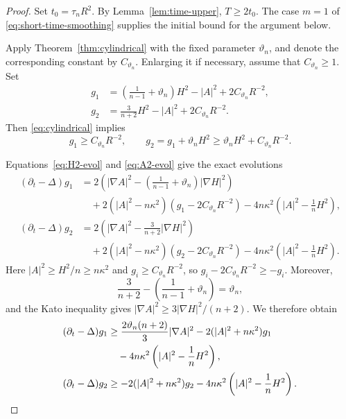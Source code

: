 \documentclass[11pt,reqno]{amsart}
\theoremstyle{definition}
\theoremstyle{remark}
\numberwithin{equation}{section}
\begin{document}
\begin{proof}
Set $t_0=\tau_nR^2$.  By Lemma~\ref{lem:time-upper}, $T\geq2t_0$.
The case $m=1$ of \eqref{eq:short-time-smoothing} supplies the initial bound
for the argument below.

Apply Theorem~\ref{thm:cylindrical} with the fixed parameter $\vartheta_n$,
and denote the corresponding constant by $C_{\vartheta_n}$.  Enlarging it if
necessary, assume that $C_{\vartheta_n}\geq1$.  Set
\begin{align*}
 g_1&=
 \left(\frac1{n-1}+\vartheta_n\right)H^2-|A|^2
 +2C_{\vartheta_n}R^{-2},\\
 g_2&=
 \frac3{n+2}H^2-|A|^2
 +2C_{\vartheta_n}R^{-2}.
\end{align*}
Then \eqref{eq:cylindrical} implies
\begin{equation}\label{eq:g1g2-lower}
 g_1\geq C_{\vartheta_n}R^{-2},
 \qquad
 g_2=g_1+\vartheta_nH^2
 \geq\vartheta_nH^2+C_{\vartheta_n}R^{-2}.
\end{equation}

Equations~\eqref{eq:H2-evol} and \eqref{eq:A2-evol} give the exact
evolutions
\begin{align*}
 (\partial_t-\Delta)g_1
 &={}
 2\left(|\nabla A|^2
 -\left(\frac1{n-1}+\vartheta_n\right)|\nabla H|^2\right)\\
 &\quad
 +2(|A|^2-n\kappa^2)
 \left(g_1-2C_{\vartheta_n}R^{-2}\right)
 -4n\kappa^2\left(|A|^2-\frac1nH^2\right),\\
 (\partial_t-\Delta)g_2
 &={}
 2\left(|\nabla A|^2-\frac3{n+2}|\nabla H|^2\right)\\
 &\quad
 +2(|A|^2-n\kappa^2)
 \left(g_2-2C_{\vartheta_n}R^{-2}\right)
 -4n\kappa^2\left(|A|^2-\frac1nH^2\right).
\end{align*}
Here $|A|^2\geq H^2/n\geq n\kappa^2$ and
$g_i\geq C_{\vartheta_n}R^{-2}$, so
$g_i-2C_{\vartheta_n}R^{-2}\geq-g_i$.  Moreover,
\begin{equation*}
 \frac3{n+2}-\left(\frac1{n-1}+\vartheta_n\right)=\vartheta_n,
\end{equation*}
and the Kato inequality gives
$|\nabla A|^2\geq3|\nabla H|^2/(n+2)$.  We therefore obtain
\begin{align}
 (\partial_t-\Delta)g_1
 &\geq
 \frac{2\vartheta_n(n+2)}3|\nabla A|^2
 -2(|A|^2+n\kappa^2)g_1 \notag\\
 &\quad
 -4n\kappa^2
 \left(|A|^2-\frac1nH^2\right),
 \label{eq:g1-gradient}\\
 (\partial_t-\Delta)g_2
 &\geq
 -2(|A|^2+n\kappa^2)g_2
 -4n\kappa^2
 \left(|A|^2-\frac1nH^2\right).
 \label{eq:g2-gradient}
\end{align}


\end{proof}
\end{document}
